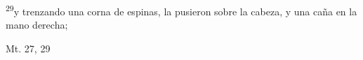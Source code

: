 \documentclass[../../rosario.tex]{subfiles}
\begin{document}
    \textsuperscript{29}y trenzando una corna de espinas, la pusieron sobre la cabeza, y una caña en la mano derecha; 
    \begin{flushright}
    Mt. 27, 29
    \end{flushright}
\end{document}

